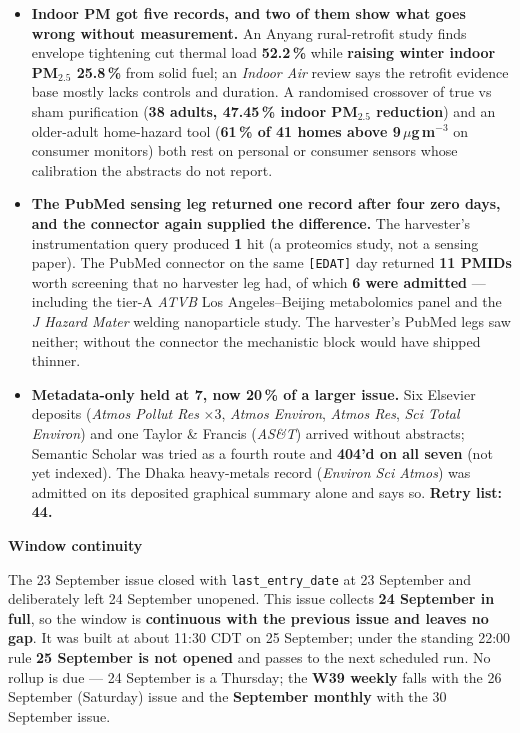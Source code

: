 \documentclass[10pt]{article}
\begin{document}
\begin{itemize}
\item \textbf{Indoor PM got five records, and two of them show what goes wrong without
measurement.} An Anyang rural-retrofit study finds envelope tightening cut thermal load
\textbf{52.2\,\%} while \textbf{raising winter indoor PM$_{2.5}$ 25.8\,\%} from solid fuel; an
\textit{Indoor Air} review says the retrofit evidence base mostly lacks controls and duration.
A randomised crossover of true vs sham purification (\textbf{38 adults, 47.45\,\% indoor
PM$_{2.5}$ reduction}) and an older-adult home-hazard tool (\textbf{61\,\% of 41 homes above
9\,$\mu$g\,m$^{-3}$} on consumer monitors) both rest on personal or consumer sensors whose
calibration the abstracts do not report.

\item \textbf{The PubMed sensing leg returned one record after four zero days, and the connector
again supplied the difference.} The harvester's instrumentation query produced \textbf{1} hit
(a proteomics study, not a sensing paper). The PubMed connector on the same \texttt{[EDAT]} day
returned \textbf{11 PMIDs} worth screening that no harvester leg had, of which \textbf{6 were
admitted} --- including the tier-A \textit{ATVB} Los Angeles--Beijing metabolomics panel and
the \textit{J Hazard Mater} welding nanoparticle study. The harvester's PubMed legs saw neither;
without the connector the mechanistic block would have shipped thinner.

\item \textbf{Metadata-only held at 7, now 20\,\% of a larger issue.} Six Elsevier deposits
(\textit{Atmos Pollut Res} $\times$3, \textit{Atmos Environ}, \textit{Atmos Res}, \textit{Sci
Total Environ}) and one Taylor \& Francis (\textit{AS\&T}) arrived without abstracts; Semantic
Scholar was tried as a fourth route and \textbf{404'd on all seven} (not yet indexed). The
Dhaka heavy-metals record (\textit{Environ Sci Atmos}) was admitted on its deposited graphical
summary alone and says so. \textbf{Retry list: 44.}

\end{itemize}

\vspace{2mm}

\begin{keybox}
{\sffamily\bfseries\footnotesize\color{Deep}Window continuity}\\[1.2mm]
{\fontsize{7.2}{8.8}\selectfont
The 23 September issue closed with \texttt{last\_entry\_date} at 23 September and deliberately
left 24 September unopened. This issue collects \textbf{24 September in full}, so the window is
\textbf{continuous with the previous issue and leaves no gap}. It was built at about 11:30 CDT on
25 September; under the standing 22:00 rule \textbf{25 September is not opened} and passes to the
next scheduled run. No rollup is due --- 24 September is a Thursday; the \textbf{W39 weekly}
falls with the 26 September (Saturday) issue and the \textbf{September monthly} with the
30 September issue.\par}
\end{keybox}
\end{document}
